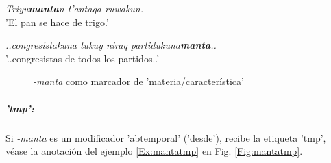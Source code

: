 \documentclass[a4paper,11pt,DIV12]{scrartcl}
\begin{document}
\begin{examples}
 \item\label{Ex:mantamateria} {\em Triyu\textbf{manta}n t'antaqa ruwakun.}\\
      'El pan se hace de trigo.'\\
        	 \hfill{\small \citep[125]{Cusi2}}
 \item\label{Ex:mantamod} {\em ..congresistakuna tukuy niraq partidukuna\textbf{manta}..}\\
      '..congresistas de todos los partidos..'\\
        	 \hfill{\small \citep{Defensora}}
\end{examples}



\begin{figure}
 \begin{center}
\end{center}
\caption{{\em -manta} como marcador de 'materia/caracter\'istica'}\label{Fig:mantamod}
\end{figure}

\subparagraph{'tmp':}
Si {\em -manta} es un modificador 'abtemporal' ('desde'), recibe la etiqueta 'tmp', v\'ease la anotaci\'on del ejemplo \ref{Ex:mantatmp} en Fig. \ref{Fig:mantatmp}. 
\end{document}

